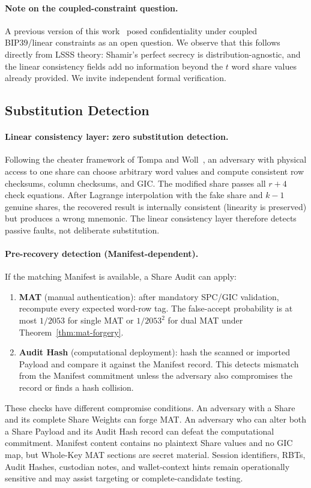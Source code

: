 \documentclass[11pt]{article}
\begin{document}
\paragraph{Note on the coupled-constraint question.} A previous version of this work~\cite{schiavinato041} posed confidentiality under coupled BIP39/linear constraints as an open question. We observe that this follows directly from LSSS theory: Shamir's perfect secrecy is distribution-agnostic, and the linear consistency fields add no information beyond the $t$ word share values already provided. We invite independent formal verification.

\subsection{Substitution Detection}
\label{sec:substitution}

\paragraph{Linear consistency layer: zero substitution detection.} Following the cheater framework of Tompa and Woll~\cite{tompa1988}, an adversary with physical access to one share can choose arbitrary word values and compute consistent row checksums, column checksums, and GIC. The modified share passes all $r + 4$ check equations. After Lagrange interpolation with the fake share and $k{-}1$ genuine shares, the recovered result is internally consistent (linearity is preserved) but produces a wrong mnemonic. The linear consistency layer therefore detects passive faults, not deliberate substitution.

\paragraph{Pre-recovery detection (Manifest-dependent).} If the matching Manifest is available, a Share Audit can apply:
\begin{enumerate}[noitemsep]
    \item \textbf{MAT} (manual authentication): after mandatory SPC/GIC validation, recompute every expected word-row tag. The false-accept probability is at most $1/2053$ for single MAT or $1/2053^2$ for dual MAT under Theorem~\ref{thm:mat-forgery}.
    \item \textbf{Audit Hash} (computational deployment): hash the scanned or imported Payload and compare it against the Manifest record. This detects mismatch from the Manifest commitment unless the adversary also compromises the record or finds a hash collision.
\end{enumerate}
These checks have different compromise conditions. An adversary with a Share and its complete Share Weights can forge MAT. An adversary who can alter both a Share Payload and its Audit Hash record can defeat the computational commitment. Manifest content contains no plaintext Share values and no GIC map, but Whole-Key MAT sections are secret material. Session identifiers, RBTs, Audit Hashes, custodian notes, and wallet-context hints remain operationally sensitive and may assist targeting or complete-candidate testing.
\end{document}
